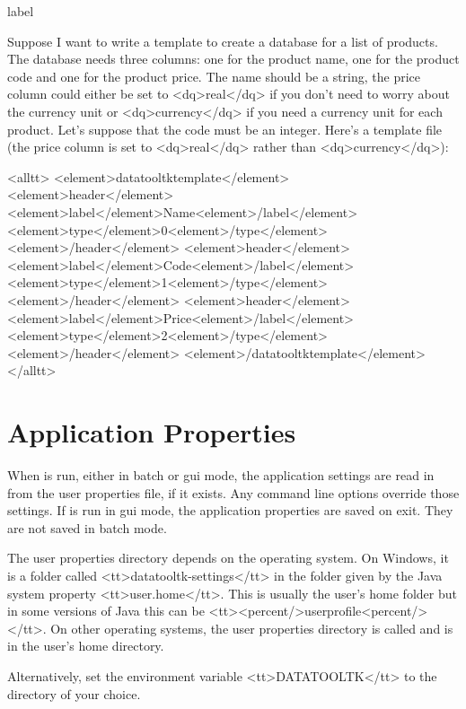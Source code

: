 \begin{example}{label}{}

   Suppose I want to write a template to create a database
   for a list of products. The database needs three columns: one for
   the product name, one for the product code and one for the product price.
   The name should be a string, the price column could either be set
   to <dq>real</dq> if you don't need to worry about the currency unit
   or <dq>currency</dq> if you need a currency unit for each product.
   Let's suppose that the code must be an integer.
   Here's a template file (the price column is set to <dq>real</dq>
   rather than <dq>currency</dq>):

<alltt>
<element>datatooltktemplate</element>
  <element>header</element>
    <element>label</element>Name<element>/label</element>
    <element>type</element>0<element>/type</element>
  <element>/header</element>
  <element>header</element>
    <element>label</element>Code<element>/label</element>
    <element>type</element>1<element>/type</element>
  <element>/header</element>
  <element>header</element>
    <element>label</element>Price<element>/label</element>
    <element>type</element>2<element>/type</element>
  <element>/header</element>
<element>/datatooltktemplate</element>
</alltt>
\end{example}

\chapter{Application Properties}\label{preferences}

   When  is run, either in batch or \gls{gui} mode, 
   the application settings are read in from the user properties file, 
   if it exists. Any command line options override those settings.
   If  is run in \gls{gui} mode, the application properties are saved on exit. They are not saved in batch mode.


   The user properties directory depends on the operating system.
   On Windows, it is a folder called <tt>datatooltk-settings</tt>
   in the folder given by the Java system property <tt>user.home</tt>.
   This is usually the user's home folder but in some versions of
   Java this can be <tt><percent/>userprofile<percent/></tt>.
   On other operating systems, the user properties directory is
   called  and is in the user's home directory.


   Alternatively, set the environment variable <tt>DATATOOLTK</tt>
   to the directory of your choice.


